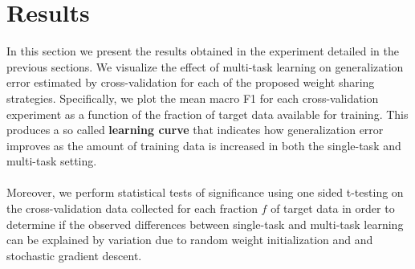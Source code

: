 \chapter{Results}
In this section we present the results obtained in the experiment detailed in the previous sections. We visualize the effect of multi-task learning on generalization error estimated by cross-validation for each of the proposed weight sharing strategies. Specifically, we plot the mean macro F1 for each cross-validation experiment as a function of the fraction of target data available for training. This produces a so called \textbf{learning curve} that indicates how generalization error improves as the amount of training data is increased in both the single-task and multi-task setting.
\\\\
Moreover, we perform statistical tests of significance using one sided t-testing on the cross-validation data collected for each fraction $f$ of target data in order to determine if the observed differences between single-task and multi-task learning can be explained by variation due to random weight initialization and and stochastic gradient descent.
